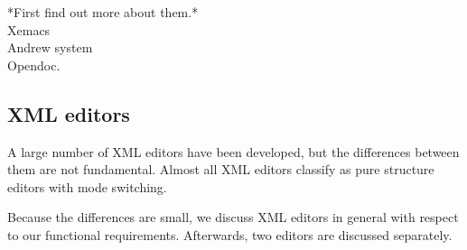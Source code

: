 \documentclass{speauth}
\begin{document}
\bc
\toHere     %


*First find out more about them.*\\
Xemacs\\
Andrew system\\
Opendoc.\\

\fromHere  %


\ec

%																
\subsection{XML editors} \label{sect:xmlEditors}

A large number of XML editors have been developed, but the differences between them are not fundamental. Almost all XML editors classify as pure structure editors with mode switching. 

Because the differences are small, we discuss XML editors in general with respect to our functional requirements. Afterwards, two  editors are discussed separately.
\end{document}
